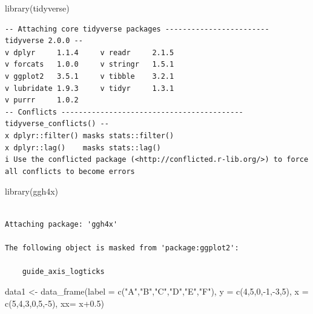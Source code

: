 \documentclass[
  letterpaper,
  DIV=11,
  numbers=noendperiod]{scrartcl}
\newenvironment{Shaded}{\begin{snugshade}}{\end{snugshade}}
\newcommand{\AttributeTok}[1]{\textcolor[rgb]{0.40,0.45,0.13}{#1}}
\newcommand{\DecValTok}[1]{\textcolor[rgb]{0.68,0.00,0.00}{#1}}
\newcommand{\FloatTok}[1]{\textcolor[rgb]{0.68,0.00,0.00}{#1}}
\newcommand{\FunctionTok}[1]{\textcolor[rgb]{0.28,0.35,0.67}{#1}}
\newcommand{\NormalTok}[1]{\textcolor[rgb]{0.00,0.23,0.31}{#1}}
\newcommand{\OtherTok}[1]{\textcolor[rgb]{0.00,0.23,0.31}{#1}}
\newcommand{\SpecialCharTok}[1]{\textcolor[rgb]{0.37,0.37,0.37}{#1}}
\newcommand{\StringTok}[1]{\textcolor[rgb]{0.13,0.47,0.30}{#1}}
\begin{document}
\begin{Shaded}
\begin{Highlighting}[]
\FunctionTok{library}\NormalTok{(tidyverse)}
\end{Highlighting}
\end{Shaded}

\begin{verbatim}
-- Attaching core tidyverse packages ------------------------ tidyverse 2.0.0 --
v dplyr     1.1.4     v readr     2.1.5
v forcats   1.0.0     v stringr   1.5.1
v ggplot2   3.5.1     v tibble    3.2.1
v lubridate 1.9.3     v tidyr     1.3.1
v purrr     1.0.2     
-- Conflicts ------------------------------------------ tidyverse_conflicts() --
x dplyr::filter() masks stats::filter()
x dplyr::lag()    masks stats::lag()
i Use the conflicted package (<http://conflicted.r-lib.org/>) to force all conflicts to become errors
\end{verbatim}

\begin{Shaded}
\begin{Highlighting}[]
\FunctionTok{library}\NormalTok{(ggh4x)}
\end{Highlighting}
\end{Shaded}

\begin{verbatim}

Attaching package: 'ggh4x'

The following object is masked from 'package:ggplot2':

    guide_axis_logticks
\end{verbatim}

\begin{Shaded}
\begin{Highlighting}[]
\NormalTok{data1 }\OtherTok{\textless{}{-}} \FunctionTok{data\_frame}\NormalTok{(}\AttributeTok{label =} \FunctionTok{c}\NormalTok{(}\StringTok{"A"}\NormalTok{,}\StringTok{"B"}\NormalTok{,}\StringTok{"C"}\NormalTok{,}\StringTok{"D"}\NormalTok{,}\StringTok{"E"}\NormalTok{,}\StringTok{"F"}\NormalTok{),}
                          \AttributeTok{y =} \FunctionTok{c}\NormalTok{(}\DecValTok{4}\NormalTok{,}\DecValTok{5}\NormalTok{,}\DecValTok{0}\NormalTok{,}\SpecialCharTok{{-}}\DecValTok{1}\NormalTok{,}\SpecialCharTok{{-}}\DecValTok{3}\NormalTok{,}\DecValTok{5}\NormalTok{),}
                          \AttributeTok{x =} \FunctionTok{c}\NormalTok{(}\DecValTok{5}\NormalTok{,}\DecValTok{4}\NormalTok{,}\DecValTok{3}\NormalTok{,}\DecValTok{0}\NormalTok{,}\DecValTok{5}\NormalTok{,}\SpecialCharTok{{-}}\DecValTok{5}\NormalTok{),}
                          \AttributeTok{xx=}\NormalTok{ x}\FloatTok{+0.5}\NormalTok{)}
\end{Highlighting}
\end{Shaded}
\end{document}
